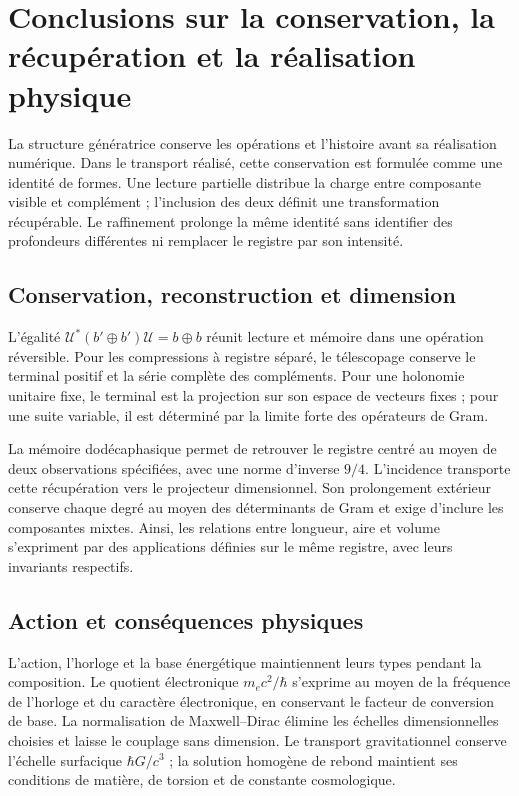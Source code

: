 \chapter{Conclusions sur la conservation, la récupération et la réalisation physique}
\label{x_reciprocidad:nuclear:sintesis}
La structure génératrice conserve les opérations et l’histoire avant sa réalisation numérique. Dans le transport réalisé, cette conservation est formulée comme une identité de formes. Une lecture partielle distribue la charge entre composante visible et complément ; l’inclusion des deux définit une transformation récupérable. Le raffinement prolonge la même identité sans identifier des profondeurs différentes ni remplacer le registre par son intensité.

\section{Conservation, reconstruction et dimension}
L’égalité \(\mathcal U^*(b'\oplus b')\mathcal U=b\oplus b\) réunit lecture et mémoire dans une opération réversible. Pour les compressions à registre séparé, le télescopage conserve le terminal positif et la série complète des compléments. Pour une holonomie unitaire fixe, le terminal est la projection sur son espace de vecteurs fixes ; pour une suite variable, il est déterminé par la limite forte des opérateurs de Gram.

La mémoire dodécaphasique permet de retrouver le registre centré au moyen de deux observations spécifiées, avec une norme d’inverse \(9/4\). L’incidence transporte cette récupération vers le projecteur dimensionnel. Son prolongement extérieur conserve chaque degré au moyen des déterminants de Gram et exige d’inclure les composantes mixtes. Ainsi, les relations entre longueur, aire et volume s’expriment par des applications définies sur le même registre, avec leurs invariants respectifs.

\section{Action et conséquences physiques}
L’action, l’horloge et la base énergétique maintiennent leurs types pendant la composition. Le quotient électronique \(m_ec^2/\hbar\) s’exprime au moyen de la fréquence de l’horloge et du caractère électronique, en conservant le facteur de conversion de base. La normalisation de Maxwell--Dirac élimine les échelles dimensionnelles choisies et laisse le couplage sans dimension. Le transport gravitationnel conserve l’échelle surfacique \(\hbar G/c^3\) ; la solution homogène de rebond maintient ses conditions de matière, de torsion et de constante cosmologique.

